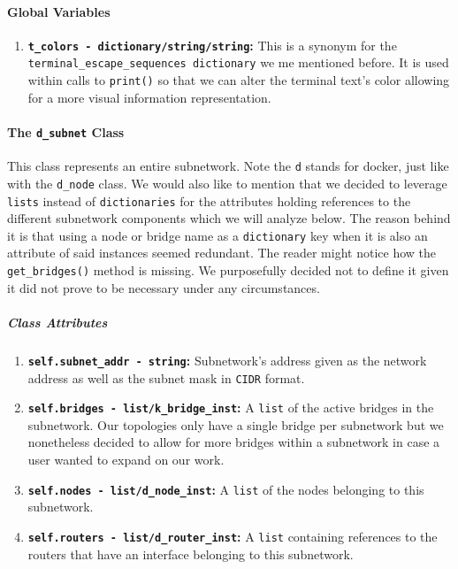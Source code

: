     \paragraph{Global Variables}
        \begin{enumerate}
            \item \textbf{\texttt{\allowbreak t\_colors - dictionary/string/string}:} This is a synonym for the \texttt{\allowbreak terminal\_escape\_sequences dictionary} we me mentioned before. It is used within calls to \texttt{print()} so that we can alter the terminal text's color allowing for a more visual information representation.
        \end{enumerate}

    \paragraph{The \texttt{d\_subnet} Class}
        This class represents an entire subnetwork. Note the \texttt{d} stands for docker, just like with the \texttt{d\_node} class. We would also like to mention that we decided to leverage \texttt{lists} instead of \texttt{dictionaries} for the attributes holding references to the different subnetwork components which we will analyze below. The reason behind it is that using a node or bridge name as a \texttt{dictionary} key when it is also an attribute of said instances seemed redundant. The reader might notice how the \texttt{get\_bridges()} method is missing. We purposefully decided not to define it given it did not prove to be necessary under any circumstances.

        \subparagraph{Class Attributes}
            \begin{enumerate}
                \item \textbf{\texttt{self.subnet\_addr - string}:} Subnetwork's address given as the network address as well as the subnet mask in \texttt{CIDR} format.
                \item \textbf{\texttt{self.bridges - list/k\_bridge\_inst}:} A \texttt{list} of the active bridges in the subnetwork. Our topologies only have a single bridge per subnetwork but we nonetheless decided to allow for more bridges within a subnetwork in case a user wanted to expand on our work.
                \item \textbf{\texttt{self.nodes - list/d\_node\_inst}:} A \texttt{list} of the nodes belonging to this subnetwork.
                \item \textbf{\texttt{self.routers - list/d\_router\_inst}:} A \texttt{list} containing references to the routers that have an interface belonging to this subnetwork.
            \end{enumerate}

